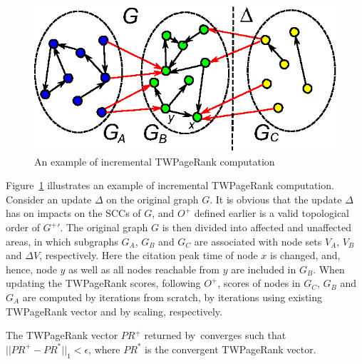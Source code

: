 \begin{figure}[tb!]
\centering
\includegraphics[scale=0.6]{fig/General_framework_peak.eps}
\vspace{-2.5ex}
\caption{\small An example of incremental TWPageRank computation}
\label{fig-inc-division}
\vspace{-4ex}
\end{figure}

\begin{example} \label{eg-layer-dag}
Figure~\ref{fig-inc-division} illustrates an example of incremental TWPageRank computation. Consider an update $\Delta$ on the original graph $G$. 
%
It is obvious that the update $\Delta$ has on impacts on the SCCs of $G$, and $O^+$ defined earlier is a valid topological order of $G^+{'}$. 
%
The original graph $G$ is then divided into affected and unaffected areas, in which subgraphs $G_A$, $G_B$ and $G_C$ are associated with node sets $V_A$, $V_B$ and $\Delta V$, respectively. Here the citation peak time of node $x$ is changed, and, hence, node $y$ as well as all nodes reachable from $y$ are included in $G_B$.
%
When updating the TWPageRank scores, following $O^+$, scores of nodes in $G_C$, $G_B$ and $G_A$ are computed by iterations from scratch, by iterations using existing TWPageRank vector and by scaling, respectively.
\end{example}

\begin{theorem}
\label{lemma-subgraphA}
The TWPageRank vector $PR^+$ returned by~\inctwprscc converges such that $||PR^+-PR^{*}||_1 < \epsilon$, where $PR^{*}$ is the convergent TWPageRank vector.
\end{theorem}

